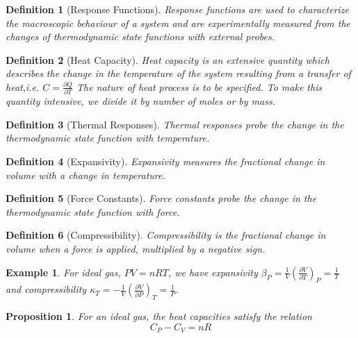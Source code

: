 \documentclass[a4paper]{article}
\newtheorem{defi}{Definition}[section]
\newtheorem{eg}{Example}[section]
\newtheorem{prop}{Proposition}[section]
\theoremstyle{new}
\begin{document}
\begin{defi}[Response Functions]
Response functions are used to characterize the macroscopic behaviour of a system and are experimentally measured from the changes of thermodynamic state functions with external probes.
\end{defi}
\begin{defi}[Heat Capacity]
Heat capacity is an extensive quantity which describes the change in the temperature of the system resulting from a transfer of heat,i.e. $C=\frac{\partial Q}{\partial T}$ The nature of heat process is to be specified. To make this quantity intensive, we divide it by number of moles or by mass.
\end{defi}
\begin{defi}[Thermal Responses]
Thermal responses probe the change in the thermodynamic state function with temperature.
\end{defi}
\begin{defi}[Expansivity]
Expansivity measures the fractional change in volume with a change in temperature.
\end{defi}
\begin{defi}[Force Constants]
Force constants probe the change in the thermodynamic state function with force.
\end{defi}
\begin{defi}[Compressibility]
Compressibility is the fractional change in volume when a force is applied, multiplied by a negative sign.
\end{defi}
\begin{eg}
For ideal gas, $PV=nRT$, we have expansivity $\beta_P=\frac{1}{V}(\frac{\partial V}{\partial T})_P=\frac{1}{T}$ and compressibility $\kappa_T=-\frac{1}{V}(\frac{\partial V}{\partial P})_T=\frac{1}{P}$.
\end{eg}
\begin{prop}
For an ideal gas, the heat capacities satisfy the relation
$$C_P-C_V=nR$$
\end{prop}
\end{document}
